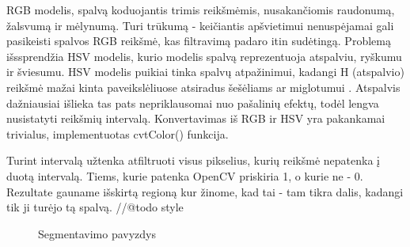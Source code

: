 \documentclass{VUMIFPSbakalaurinis}
\begin{document}
RGB modelis, spalvą koduojantis trimis reikšmėmis, nusakančiomis raudonumą, žalsvumą ir mėlynumą. Turi trūkumą - keičiantis apšvietimui nenuspėjamai gali pasikeisti spalvos RGB reikšmė, kas filtravimą padaro itin sudėtingą. Problemą išssprendžia HSV modelis, kurio modelis spalvą reprezentuoja atspalviu, ryškumu ir šviesumu. HSV modelis puikiai tinka spalvų atpažinimui, kadangi H (atspalvio) reikšmė mažai kinta paveikslėliuose atsiradus šešėliams \cite{1039893} ar miglotumui \cite{7457892}. Atspalvis dažniausiai išlieka tas pats nepriklausomai nuo pašalinių efektų, todėl lengva nusistatyti reikšmių intervalą. Konvertavimas iš RGB ir HSV yra pakankamai trivialus, implementuotas cvtColor() funkcija. 

Turint intervalą užtenka atfiltruoti visus pikselius, kurių reikšmė nepatenka į duotą intervalą. Tiems, kurie patenka OpenCV priskiria 1, o kurie ne - 0. Rezultate gauname išskirtą regioną kur žinome, kad tai - tam tikra dalis, kadangi tik ji turėjo tą spalvą. //@todo style
\begin{figure}[H]
	\centering
	\qquad
	\caption{Segmentavimo pavyzdys}
	\label{fig:example}
\end{figure}
\end{document}
